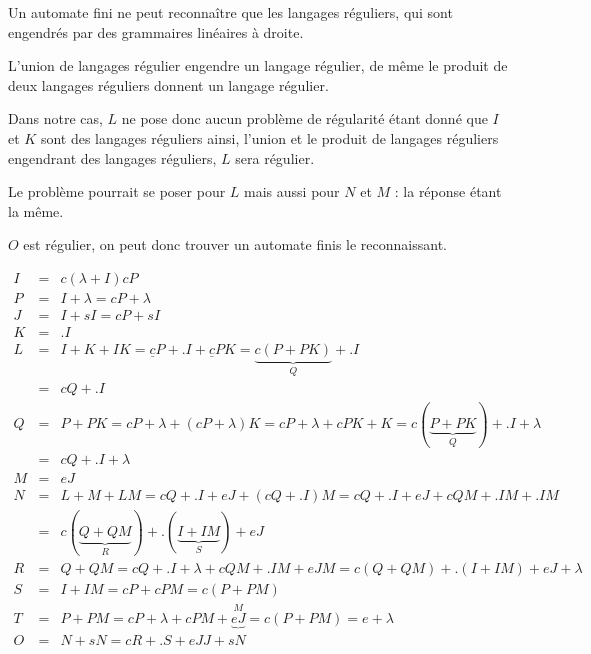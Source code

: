 \documentclass[12pt,a4paper,openany]{book}
\begin{document}
\begin{remarque}
	Un automate fini ne peut reconnaître que les langages réguliers, qui sont engendrés par des grammaires linéaires à droite.

	L'union de langages régulier engendre un langage régulier, de même le produit de deux langages réguliers donnent un langage régulier. 
\end{remarque}

Dans notre cas, $L$ ne pose donc aucun problème de régularité étant donné que $I$ et $K$ sont des langages réguliers ainsi, l'union et le produit de
langages réguliers engendrant des langages réguliers, $L$ sera régulier. 

Le problème pourrait se poser pour $L$ mais aussi pour $N$ et $M$ : la
réponse étant la même.

$O$ est régulier, on peut donc trouver un automate finis le reconnaissant.

\begin{eqnarray*}
	I &=&  c(\lambda + I)  cP\\
	P &=& I + \lambda = cP+\lambda\\
	J &=&  I+sI = cP+sI\\
	K &=& . I\\
	L &=& I+K+IK = \underline{c}P+.I + \underline{c}PK = \underbrace{c(P+PK)}_{Q} + .I\\ &=&  cQ+.I\\
	Q &=& P + PK = cP + \lambda + (cP+\lambda)K = cP + \lambda + cPK + K = c(\underbrace{P+PK}_{Q}) + .I + \lambda\\ &=&  cQ+.I+\lambda\\
	M &=& eJ\\
	N &=&  L+M+LM = cQ + .I + eJ + (cQ+.I)M = cQ + .I + eJ + cQM + .IM + .IM\\ &=& c(\underbrace{Q + QM}_{R}) + .(\underbrace{I+IM}_{S})+ eJ\\
	R &=& Q + QM = cQ+.I+\lambda+cQM+.IM+eJM = c(Q+QM) + .(I+IM)+ eJ+ \lambda\\
	S &=& I + IM = cP + cPM = c(P+PM)\\
	T &=& P+PM = cP+\lambda + cPM + \underbrace{eJ}^{M} = c(P+PM) = e + \lambda\\
	O &=& N + sN = cR+.S+eJJ+sN
\end{eqnarray*}
\end{document}
